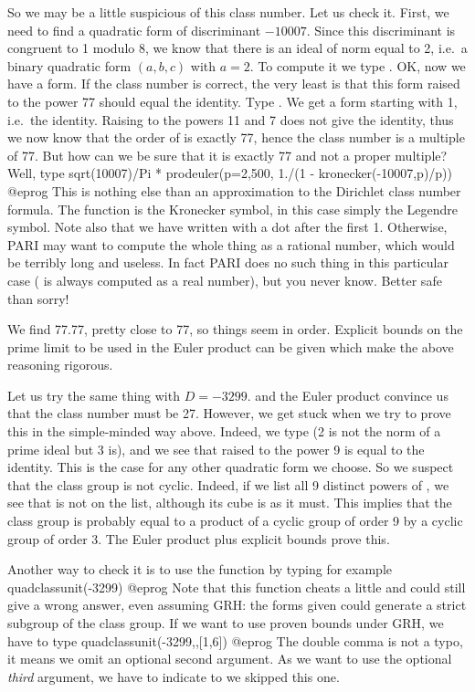 So we may be a little suspicious of this class number. Let us check it.
First, we need to find a quadratic form of discriminant $-10007$. Since this
discriminant is congruent to 1 modulo 8, we know that there is an ideal of
norm equal to 2, i.e.~a binary quadratic form $(a,b,c)$ with $a=2$. To
compute it we type . OK, now we have a form.
If the class number is correct, the very least is that this form raised to
the power 77 should equal the identity. Type . We get a form
starting with 1, i.e.~the identity. Raising  to the powers 11 and 7
does not give the identity, thus we now know that the order of  is
exactly 77, hence the class number is a multiple of 77. But how can we be
sure that it is exactly 77 and not a proper multiple? Well, type
\bprog
  sqrt(10007)/Pi * prodeuler(p=2,500, 1./(1 - kronecker(-10007,p)/p))
@eprog\noindent
This is nothing else than an approximation to the Dirichlet class number
formula. The function  is the Kronecker symbol, in this case
simply the Legendre symbol. Note also that we have written 
with a dot after the first 1. Otherwise, PARI may want to compute the whole
thing as a rational number, which would be terribly long and useless. In fact
PARI does no such thing in this particular case ( is always
computed as a real number), but you never know. Better safe than sorry!

We find 77.77, pretty close to 77, so things seem in order. Explicit bounds
on the prime limit to be used in the Euler product can be given which make
the above reasoning rigorous.

Let us try the same thing with $D=-3299$.  and the Euler
product convince us that the class number must be 27. However, we get stuck
when we try to prove this in the simple-minded way above. Indeed, we type
 (2 is not the norm of a prime ideal but
3 is), and we see that  raised to the power 9 is equal to the identity.
This is the case for any other quadratic form we choose. So we suspect that the
class group is not cyclic. Indeed, if we list all 9 distinct powers of ,
we see that  is not on the list, although its cube
is as it must. This implies that the class group is probably equal to a
product of a cyclic group of order 9 by a cyclic group of order 3. The Euler
product plus explicit bounds prove this.

Another way to check it is to use the  function by typing
for example
\bprog
  quadclassunit(-3299)
@eprog\noindent
Note that this function cheats a little and could still give a wrong answer,
even assuming GRH: the forms given could generate a strict subgroup of the
class group. If we want to use proven bounds under GRH, we have to type
\bprog
  quadclassunit(-3299,,[1,6])
@eprog\noindent
The double comma \kbd{,,} is not a typo, it means we omit an optional second
argument. As we want to use the optional \emph{third} argument, we have to
indicate to  we skipped this one.

